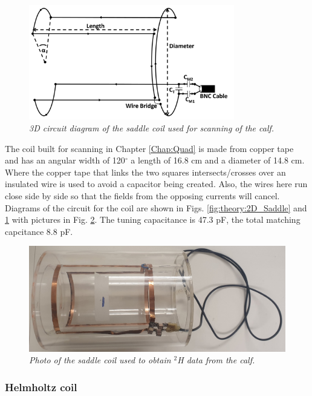 \begin{figure}
    \centering
    \includegraphics[width=0.8\textwidth]{Figures/Theory/3D_Saddle.png}
    \caption{\textit{3D circuit diagram of the saddle coil used for scanning of the calf.}}
    \label{fig:theory:3D_Saddle}
\end{figure}

The coil built for scanning in Chapter \ref{Chap:Quad} is made from copper tape and has an angular width of 120$^\circ$ a length of 16.8 cm and a diameter of 14.8 cm. Where the copper tape that links the two squares intersects/crosses over an insulated wire is used to avoid a capacitor being created. Also, the wires here run close side by side so that the fields from the opposing currents will cancel. Diagrams of the circuit for the coil are shown in Figs. \ref{fig:theory:2D_Saddle} and \ref{fig:theory:3D_Saddle} with pictures in Fig. \ref{fig:theory:Saddle_pic}. The tuning capacitance is 47.3 pF, the total matching capcitance 8.8 pF.

\begin{figure}
    \centering
    \includegraphics[width=1\textwidth]{Figures/Theory/Saddle_Coil.jpg}
    \caption{\textit{Photo of the saddle coil used to obtain $^2$H data from the calf.}}
    \label{fig:theory:Saddle_pic}
\end{figure}

\subsubsection{Helmholtz coil}

